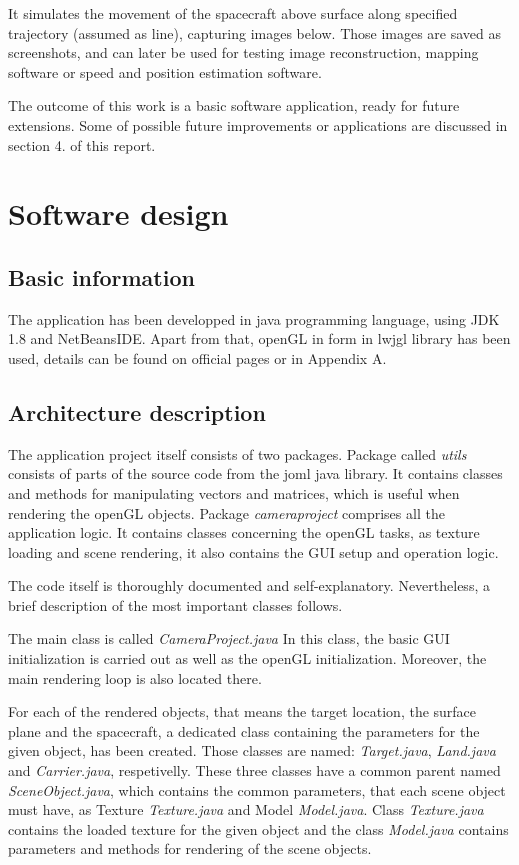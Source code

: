 \documentclass[english,12pt,a4paper,pdftex,elec,utf8]{aaltothesis}
\begin{document}
It simulates the movement of the spacecraft above surface along specified trajectory (assumed as line), capturing images below. Those images are saved as screenshots, and can later be used for testing image reconstruction, mapping software or speed and position estimation software.

The outcome of this work is a basic software application, ready for future extensions. Some of possible future improvements or applications are discussed in section 4. of this report.

\clearpage

\section{Software design}
\subsection*{Basic information}
The application has been developped in java programming language, using JDK 1.8\cite{java} and NetBeansIDE\cite{NetBeans}. Apart from that, openGL in form in lwjgl \cite{lwjgl} library has been used, details can be found on official pages or in Appendix A.

\subsection*{Architecture description}
The application project itself consists of two packages. 
Package called \textit{utils} consists of parts of the source code from the joml java library. It contains classes and methods for manipulating vectors and matrices, which is useful when rendering the openGL objects. 
Package \textit{cameraproject} comprises all the application logic. It contains classes concerning the openGL tasks, as texture loading and scene rendering, it also contains the GUI setup and operation logic.

The code itself is thoroughly documented and self-explanatory. Nevertheless, a brief description of the most important classes follows.

The main class is called \textit{CameraProject.java} In this class, the basic GUI initialization is carried out as well as the openGL initialization. Moreover, the main rendering loop is also located there.

For each of the rendered objects, that means the target location, the surface plane and the spacecraft, a dedicated class containing the parameters for the given object, has been created. Those classes are named: \textit{Target.java}, \textit{Land.java} and \textit{Carrier.java}, respetivelly. These three classes have a common parent named \textit{SceneObject.java}, which contains the common parameters, that each scene object must have, as Texture \textit{Texture.java} and Model \textit{Model.java}. Class \textit{Texture.java} contains the loaded texture for the given object and the class \textit{Model.java} contains parameters and methods for rendering of the scene objects.
\end{document}
